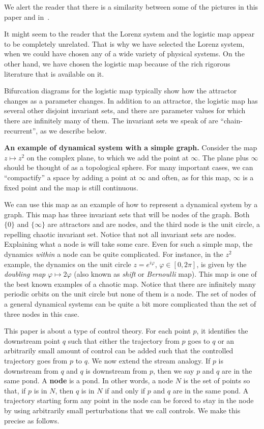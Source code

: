 \documentclass{article}
\def\phi{\varphi}
\begin{document}

We alert the reader that there is a similarity between some of the pictures in this paper and in~\cite{DLY20}.

It might seem to the reader that the Lorenz system and the logistic map appear to be completely unrelated. 
That is why we have selected the Lorenz system, when we could have chosen any of a wide variety of physical systems. On the other hand, we have chosen the logistic map because of the rich rigorous literature that is available on it. 

Bifurcation diagrams for the logistic map typically show how the attractor changes as a parameter changes.
In addition to an attractor, the logistic map has several other disjoint invariant sets, and there are  parameter values for which there are infinitely many of them. The invariant sets we speak of are ``chain-recurrent'', as we describe below.


{\bf An example of dynamical system with a simple graph.}
Consider the  
 map $z\mapsto z^2$ 
 on the complex plane, to which we add the point at $ \infty$. The plane plus $\infty$ should be thought of as a topological sphere. For many important cases, we can ``compactify'' a space by adding a point at $\infty$ and often, as for this map, $\infty$ is a fixed point and the map is still continuous.

 
We can use this map as an example of how to represent a dynamical system by a graph.
This map has three invariant sets that will be nodes of the graph. 
Both $\{0\}$ and $\{\infty\}$ are attractors and are nodes, and the third node is the unit circle, a repelling chaotic invariant set. 
Notice that not all invariant sets are nodes.
Explaining what a node is will take some care. 
Even for such a simple map, the dynamics {\em within} a node can be quite complicated. 
For instance, in the $z^2$ example, the dynamics on the unit circle $z=e^{i\phi}$, $\phi\in[0,2\pi]$, is given by the {\em doubling map} $\phi\mapsto2\phi$ (also known as {\em shift} or {\em Bernoulli} map). This map is one of the best known examples of a chaotic map. 
Notice that there are infinitely many periodic orbits on the unit circle but none of them is a node.
The set of nodes of a general dynamical systems can be quite a bit more complicated than the set of three nodes in this case. 

This paper is about a type of control theory. For each point $p$, it identifies the downstream point $q$ such that either the trajectory from $p$ goes to $q$ or an arbitrarily small amount of control can be added such that the controlled trajectory goes from $p$ to $q$. 
We now extend the stream analogy.
If $p$ is downstream from $q$ and $q$ is downstream from $p$, then we say $p$ and $q$ are in the same pond.
A {\bf node} is a pond. In other words, a node $N$ is the set of points so that, if $p$ is in $N$, then $q$ is in $N$ if and only if $p$ and $q$ are in the same pond.
A trajectory starting form any point in the node can be forced to stay in the node by using arbitrarily small perturbations that we call controls.
We make this precise as follows.
\end{document}
